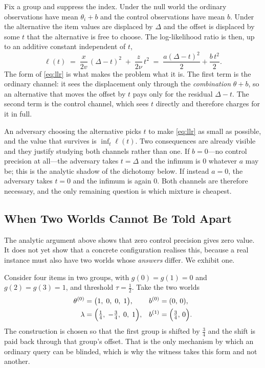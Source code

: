 Fix a group and suppress the index. Under the null world the ordinary observations have mean
$\theta_{i}+b$ and the control observations have mean $b$. Under the alternative the item
values are displaced by $\Delta$ and the offset is displaced by some $t$ that the
alternative is free to choose. The log-likelihood ratio is then, up to an additive constant
independent of $t$,
\begin{equation}
\ell(t)\;=\;\frac{x}{2v}\,(\Delta-t)^{2}\;+\;\frac{z}{2\nu}\,t^{2}
        \;=\;\frac{a(\Delta-t)^{2}}{2}+\frac{b\,t^{2}}{2}.
\label{eq:llr}
\end{equation}
The form of \eqref{eq:llr} is what makes the problem what it is. The first term is the
ordinary channel: it sees the displacement only through the \emph{combination} $\theta+b$,
so an alternative that moves the offset by $t$ pays only for the residual $\Delta-t$. The
second term is the control channel, which sees $t$ directly and therefore charges for it in
full.

An adversary choosing the alternative picks $t$ to make \eqref{eq:llr} as small as possible,
and the value that survives is $\inf_{t}\ell(t)$. Two consequences are already visible and
they justify studying both channels rather than one. If $b=0$---no control precision at
all---the adversary takes $t=\Delta$ and the infimum is $0$ whatever $a$ may be; this is the
analytic shadow of the dichotomy below. If instead $a=0$, the adversary takes $t=0$ and the
infimum is again $0$. Both channels are therefore necessary, and the only remaining question
is which mixture is cheapest.

\subsection{When Two Worlds Cannot Be Told Apart}
\label{sec:dichotomy}

The analytic argument above shows that zero control precision gives zero value. It does not
yet show that a concrete configuration realises this, because a real instance must also have
two worlds whose \emph{answers} differ. We exhibit one.

Consider four items in two groups, with $g(0)=g(1)=0$ and $g(2)=g(3)=1$, and threshold
$\tau=\tfrac{1}{2}$. Take the two worlds
\begin{align}
\theta^{(0)} &= \bigl(1,\;0,\;0,\;1\bigr), & b^{(0)} &= (0,\,0),
\label{eq:world0}\\
\lambda &= \Bigl(\tfrac{1}{4},\;-\tfrac{3}{4},\;0,\;1\Bigr), & b^{(1)} &= \Bigl(\tfrac{3}{4},\,0\Bigr).
\label{eq:world1}
\end{align}
The construction is chosen so that the first group is shifted by $\tfrac34$ and the shift is
paid back through that group's offset. That is the only mechanism by which an ordinary query
can be blinded, which is why the witness takes this form and not another.

